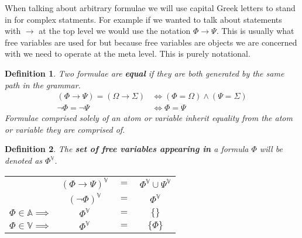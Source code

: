 \documentclass{article}
\newtheorem{defin}{Definition}
\begin{document}
When talking about arbitrary formulae we will use capital Greek letters to stand in for complex statments.
For example if we wanted to talk about statements with $\rightarrow$ at the top level we would use the notation $\Phi \rightarrow \Psi$.
This is usually what free variables are used for but because free variables are objects we are concerned with we need to operate at the meta level.
This is purely notational.

\begin{defin}
Two formulae are \textbf{equal} if they are both generated by the same path in the grammar.
\begin{align*}
(\Phi \rightarrow \Psi) = (\Omega \rightarrow \Sigma) &\iff (\Phi = \Omega) \land (\Psi = \Sigma) \\
\neg \Phi = \neg \Psi &\iff \Phi = \Psi
\end{align*}
Formulae comprised solely of an atom or variable inherit equality from the atom or variable they are comprised of.
\end{defin}

\begin{defin}
The \textbf{set of free variables appearing in} a formula $\Phi$ will be denoted as $\Phi^\mathbb{V}$.
\setlength{\tabcolsep}{1pt}
\begin{center}
	\begin{tabular}{rclc}
		                               & $(\Phi \rightarrow \Psi)^\mathbb{V}$ & $=$ & $ \Phi^\mathbb{V} \cup \Psi^\mathbb{V}$ \\
		                               & $(\neg \Phi)^\mathbb{V}            $ & $=$ & $ \Phi^\mathbb{V}               $ \\
		$\Phi \in \mathbb{A} \implies$ & $\Phi^\mathbb{V}                   $ & $=$ & $ \{\}                    $ \\
		$\Phi \in \mathbb{V} \implies$ & $\Phi^\mathbb{V}                   $ & $=$ & $ \{\Phi\}                $
	\end{tabular}
\end{center}
\end{defin}
\end{document}
